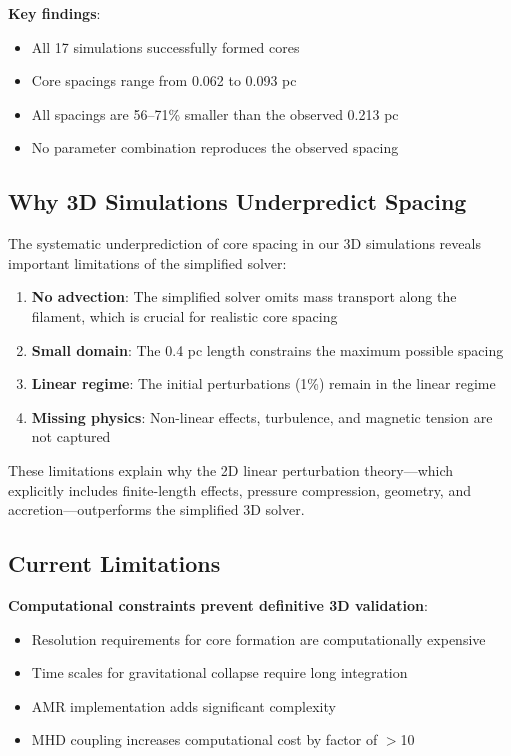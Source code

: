 \documentclass[11pt,a4paper]{article}
\begin{document}
\textbf{Key findings}:
\begin{itemize}
    \item All 17 simulations successfully formed cores
    \item Core spacings range from 0.062 to 0.093 pc
    \item All spacings are 56--71\% smaller than the observed 0.213 pc
    \item No parameter combination reproduces the observed spacing
\end{itemize}

\subsection{Why 3D Simulations Underpredict Spacing}

The systematic underprediction of core spacing in our 3D simulations reveals important limitations of the simplified solver:

\begin{enumerate}
    \item \textbf{No advection}: The simplified solver omits mass transport along the filament, which is crucial for realistic core spacing
    \item \textbf{Small domain}: The 0.4 pc length constrains the maximum possible spacing
    \item \textbf{Linear regime}: The initial perturbations (1\%) remain in the linear regime
    \item \textbf{Missing physics}: Non-linear effects, turbulence, and magnetic tension are not captured
\end{enumerate}

These limitations explain why the 2D linear perturbation theory—which explicitly includes finite-length effects, pressure compression, geometry, and accretion—outperforms the simplified 3D solver.

\subsection{Current Limitations}

\textbf{Computational constraints prevent definitive 3D validation}:
\begin{itemize}
    \item Resolution requirements for core formation are computationally expensive
    \item Time scales for gravitational collapse require long integration
    \item AMR implementation adds significant complexity
    \item MHD coupling increases computational cost by factor of $>$10
\end{itemize}
\end{document}
